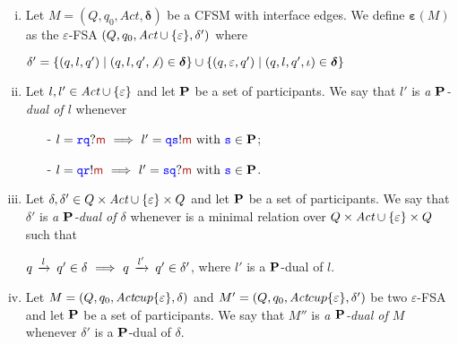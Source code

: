 \begin{definition}\label{def:PD}%
\begin{enumerate}[i)]
\item
Let $M=(Q,q_0,\textit{Act},\bm{\delta})$ be a CFSM with interface edges. We define
$\bm{\varepsilon}(M)$ as  the $\varepsilon$-FSA $(Q,q_0,\textit{Act}\cup\{\varepsilon\},\delta')$   where\\
\centerline{
$\delta' = \{(q,l,q') \mid (q,l,q',\not\iota) \in \bm{\delta}\}\cup \{(q,\varepsilon,q') \mid (q,l,q',\iota) \in \bm{\delta}\}$  }
\item
Let $l,l'\in\textit{Act}\cup\{\varepsilon\}$ and  let $\mathbf{P}$ be a set of participants.
We say that $l'$ is {\em a $\mathbf{P}$-dual of $l$} whenever 
\begin{itemize}
\item[-]
$l = \ttr\ttq?\msg[m] \implies l'= \ttq\tts!\msg[m] \text{ with } \tts\in\roles$;
\item[-]
$l = \ttq\ttr!\msg[m] \implies l'= \tts\ttq?\msg[m] \text{ with } \tts\in\roles$.
\end{itemize}
\item
Let $\delta,\delta'\in Q\times\textit{Act}\cup\{\varepsilon\}\times Q$ and  let $\mathbf{P}$ be a set of participants.
We say that $\delta'$ is {\em a $\mathbf{P}$-dual of $\delta$} whenever is a minimal relation over
 $Q\times\textit{Act}\cup\{\varepsilon\}\times Q$ such that\\
\centerline{
$q\,\xrightarrow{l}_{{}}\,q'\in\delta ~\Longrightarrow~ q\,\xrightarrow{l'}_{{}}\,q'\in\delta'$, where $l'$ is a $\mathbf{P}$-dual of $l$.
}
\item
Let $M=(Q,q_0,\textit{Act}cup\{\varepsilon\},\delta)$ and $M'=(Q,q_0,\textit{Act}cup\{\varepsilon\},\delta')$ be two $\varepsilon$-FSA and  let $\mathbf{P}$ be a set of participants.
We say that $M''$ is {\em a $\mathbf{P}$-dual of $M$} whenever $\delta'$ is a $\mathbf{P}$-dual of $\delta$.
\end{enumerate}
\end{definition}

